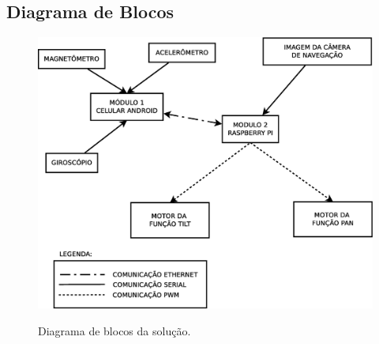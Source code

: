 \documentclass[12pt,a4paper]{article}
\begin{document}
\subsection{Diagrama de Blocos}
\begin{figure}[H]
	\centering
	\includegraphics[scale=0.45]{diagrama-modulos} 
	\label{fig:diag-modulos}
	\caption{Diagrama de blocos da solução.}
\end{figure}
\end{document}
